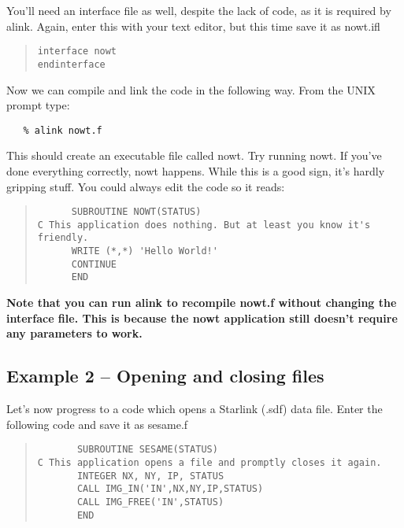       You'll need an interface file as well,
      despite the lack of code, as it is required by {\sf alink}.
      Again, enter this with your text editor, but this time save it as {\sf 
      nowt.ifl}

\begin{quote}
{\small
\begin{verbatim} 
interface nowt
endinterface
\end{verbatim}
}
\end{quote}

      Now we can compile and link the code in the following way. From the
      UNIX prompt type:

\begin{verbatim}
   % alink nowt.f
\end{verbatim}

      This should create an executable file called {\sf nowt}. Try running
      {\sf nowt}. If you've done everything correctly, nowt happens. While
      this is a good sign, it's hardly gripping stuff. You could
      always edit the code so it reads:

\begin{quote}
{\small
\begin{verbatim}
      SUBROUTINE NOWT(STATUS)
C This application does nothing. But at least you know it's friendly.
      WRITE (*,*) 'Hello World!'
      CONTINUE
      END
\end{verbatim}
}
\end{quote}

      {\bf Note that you can run {\sf alink} to 
      recompile {\sf nowt.f} without changing the interface file. This is
      because the {\sf nowt} application still doesn't require any
      parameters to work.}

\subsection{Example 2 -- Opening and closing files}

Let's now progress to a code which opens a Starlink (.sdf) 
data file. Enter the following 
code and save it as {\sf sesame.f}

\begin{quote}
{\small
\begin{verbatim}
       SUBROUTINE SESAME(STATUS)
C This application opens a file and promptly closes it again. 
       INTEGER NX, NY, IP, STATUS
       CALL IMG_IN('IN',NX,NY,IP,STATUS)
       CALL IMG_FREE('IN',STATUS)
       END
\end{verbatim}
}
\end{quote}

